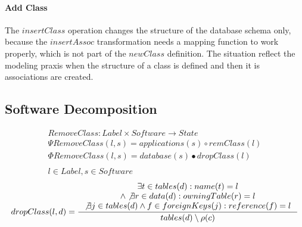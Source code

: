 \documentclass[11pt]{article}
\begin{document}
\paragraph{Add Class} The $insertClass$ operation changes the structure of the database schema only, because the $insertAssoc$ transformation needs a mapping function to work properly, which is not part of the $newClass$ definition. The situation reflect the modeling praxis when the structure of a class is defined and then it is associations are created.



\subsection{Software Decomposition}
\begin{align*}
RemoveClass: Label \times Software \rightarrow State  \\
\Psi RemoveClass(l, s) = applications(s) \circ remClass(l) \\
\Phi RemoveClass(l, s) = database(s) \bullet dropClass(l) \\
\\ l \in Label, s \in Software 
\end{align*}
\begin{align*}
dropClass(l,d) = \inference{ \exists t \in tables(d) : name(t) = l  \\ \wedge \not \exists r \in data(d) : owningTable(r) = l \\  \not \exists j \in tables(d) \wedge f \in foreignKeys(j) : reference(f) = l }{ tables(d) \setminus \rho(c)}
\end{align*}
\end{document}
